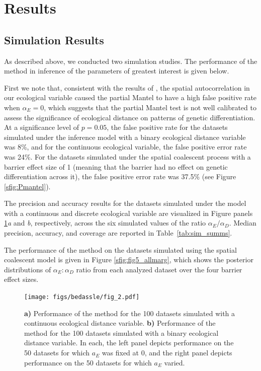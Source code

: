 \section*{Results}
\subsection*{Simulation Results}

As described above, we conducted two simulation studies.  The performance of the method in inference of the parameters of greatest interest is given below.   

First we note that,
consistent with the results of \citep{Guillot2013}, the spatial autocorrelation in our ecological variable caused the partial Mantel to have a high false positive rate when $\alpha_E=0$, which suggests that the partial Mantel test is not well calibrated to assess the significance of ecological distance on patterns of genetic differentiation.  At a significance level of $p=0.05$, the false positive rate for the datasets simulated under the inference model with a binary ecological distance variable was 8\%, and for the continuous ecological variable, the false positive error rate was 24\%.  For the datasets simulated under the spatial coalescent process with a barrier effect size of 1 (meaning that the barrier had no effect on genetic differentiation across it), the false positive error rate was 37.5\% (see Figure \ref{sfig:Pmantel}).

The precision and accuracy results for the datasets simulated under the model with a continuous and discrete ecological variable are visualized in Figure panels \ref{sfig:sim_summs}\textit{a} and \textit{b}, respectively, across the six simulated values of the ratio $\alpha_E/\alpha_D$.
Median precision, accuracy, and coverage are reported in Table~\ref{tab:sim_summs}.  

The performance of the method on the datasets simulated using the spatial coalescent model is given in Figure \ref{sfig:fig5_allmarg}, which shows the posterior distributions of $\alpha_E:\alpha_D$ ratio from each analyzed dataset over the four barrier effect sizes.

\begin{figure}[ht!]
\begin{center}
  \texttt{[image: figs/bedassle/fig\_2.pdf]}
 \caption{
	\textbf{a)}
 		Performance of the method for the 100 datasets simulated with a continuous ecological distance variable.  
	\textbf{b)}
 		Performance of the method for the 100 datasets simulated with a binary ecological distance variable.  
		In each, the left panel depicts performance on the 50 datasets for which $a_{E}$ was fixed at 0, and the right panel depicts performance on the 50 datasets for which $a_{E}$ varied.
 \label{sfig:sim_summs}
  }
\end{center}
\end{figure}

